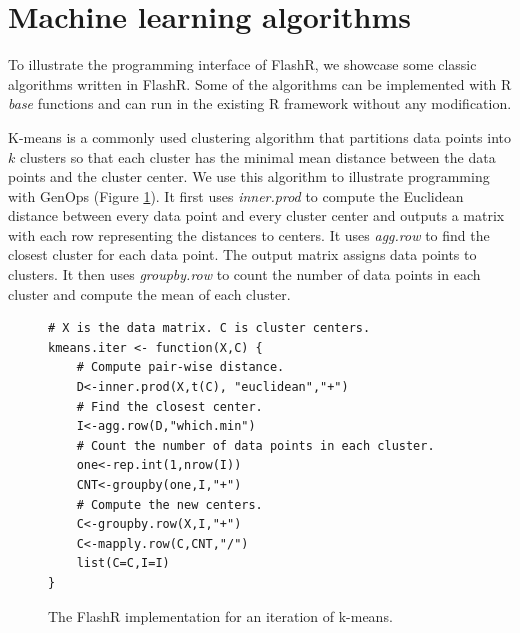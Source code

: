 
\section{Machine learning algorithms} \label{sec:apps}
To illustrate the programming interface of FlashR, we showcase some classic
algorithms written in FlashR.
Some of the algorithms can be implemented with R \textit{base} functions and
can run in the existing R framework without any modification.

K-means is a commonly used clustering algorithm that partitions data points
into $k$ clusters so that each cluster has the minimal mean distance between
the data points and the cluster center. We use this algorithm
to illustrate programming with GenOps (Figure \ref{fig:kmeans}).
It first uses \textit{inner.prod} to
compute the Euclidean distance between every data point and every cluster center
and outputs a matrix with each row representing the distances to centers.  
It uses \textit{agg.row} to find the closest
cluster for each data point.  The output matrix 
assigns data points to clusters. It then uses \textit{groupby.row} to count
the number of data points in each cluster and compute the mean of each cluster.

\begin{figure}
\centering
	\footnotesize
	\begin{verbatim}
# X is the data matrix. C is cluster centers.
kmeans.iter <- function(X,C) {
	# Compute pair-wise distance.
	D<-inner.prod(X,t(C), "euclidean","+")
	# Find the closest center.
	I<-agg.row(D,"which.min")
	# Count the number of data points in each cluster.
	one<-rep.int(1,nrow(I))
	CNT<-groupby(one,I,"+")
	# Compute the new centers.
	C<-groupby.row(X,I,"+")
	C<-mapply.row(C,CNT,"/")
	list(C=C,I=I)
}
	\end{verbatim}
	\caption{The FlashR implementation for an iteration of k-means.}
	\label{fig:kmeans}
\vspace{-10pt}
\end{figure}

